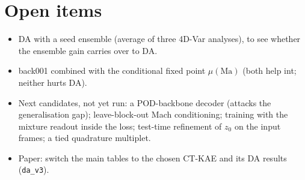 \documentclass[10.5pt,a4paper]{article}
\begin{document}
\section{Open items}
\begin{itemize}
\item DA with a seed ensemble (average of three 4D-Var analyses), to see whether the ensemble
  gain carries over to DA.
\item back001 combined with the conditional fixed point $\mu(\mathrm{Ma})$ (both help int; neither
  hurts DA).
\item Next candidates, not yet run: a POD-backbone decoder (attacks the generalisation gap);
  leave-block-out Mach conditioning; training with the mixture readout inside the loss;
  test-time refinement of $z_0$ on the input frames; a tied quadrature multiplet.
\item Paper: switch the main tables to the chosen CT-KAE and its DA results (\texttt{da\_v3}).
\end{itemize}
\end{document}
